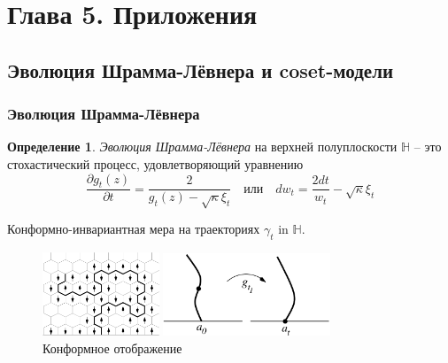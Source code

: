 \documentclass[pdftex]{beamer}
\theoremstyle{definition} \newtheorem{Def}{Определение}
\begin{document}
\section{Глава 5. Приложения}
\label{sec:applications}

\subsection{Эволюция Шрамма-Лёвнера и coset-модели}
\label{sec:SLE}
\begin{frame}
  \frametitle{Эволюция Шрамма-Лёвнера}
  \begin{Def}
    {\it Эволюция Шрамма-Лёвнера} на верхней полуплоскости  $\mathbb{H}$ -- это стохастический процесс, удовлетворяющий уравнению
    \begin{equation*}
      \frac{\partial g_t(z)}{\partial t} = \frac{ 2}{g_t(z)-\sqrt{\kappa}\xi_{t}} \quad \text{или} \quad       d w _{t}= \frac{2dt}{w_{t} }-\sqrt{\kappa}\xi_{t}
    \end{equation*}
  \end{Def}
  Конформно-инвариантная мера на траекториях $\gamma_{t}$ in $\mathbb{H}$.
  \begin{figure}[h]
    \begin{multicols}{2}
      \hfill
      \includegraphics[height=25mm]{figures/explore.pdf}
      \vspace{-0.2cm}
      \caption{Эволюция Шрамма-Лёвнера -- непрерывный предел интерфейсов}
      \label{fig:sle}
      \hfill
      \includegraphics[width=50mm]{figures/loewner.pdf}
      \caption{Конформное отображение}
      \label{fig:sle}
    \end{multicols}

  \end{figure}
\end{frame}
\end{document}
